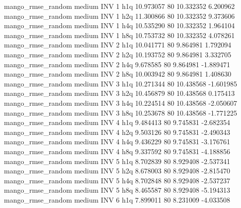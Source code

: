 mango_rmse_random     medium      INV                 1                  h1q 10.973057 80      10.332352           6.200962
mango_rmse_random     medium      INV                 1                  h2q 11.300866 80      10.332352           9.373606
mango_rmse_random     medium      INV                 1                  h4q 10.535290 80      10.332352           1.964104
mango_rmse_random     medium      INV                 1                  h8q 10.753732 80      10.332352           4.078261
mango_rmse_random     medium      INV                 2                  h1q 10.041771 80       9.864981           1.792094
mango_rmse_random     medium      INV                 2                  h2q 10.193752 80       9.864981           3.332705
mango_rmse_random     medium      INV                 2                  h4q  9.678585 80       9.864981          -1.889471
mango_rmse_random     medium      INV                 2                  h8q 10.003942 80       9.864981           1.408630
mango_rmse_random     medium      INV                 3                  h1q 10.271344 80      10.438568          -1.601985
mango_rmse_random     medium      INV                 3                  h2q 10.456879 80      10.438568           0.175413
mango_rmse_random     medium      INV                 3                  h4q 10.224514 80      10.438568          -2.050607
mango_rmse_random     medium      INV                 3                  h8q 10.253678 80      10.438568          -1.771225
mango_rmse_random     medium      INV                 4                  h1q  9.484413 80       9.745831          -2.682354
mango_rmse_random     medium      INV                 4                  h2q  9.503126 80       9.745831          -2.490343
mango_rmse_random     medium      INV                 4                  h4q  9.436229 80       9.745831          -3.176761
mango_rmse_random     medium      INV                 4                  h8q  9.337592 80       9.745831          -4.188856
mango_rmse_random     medium      INV                 5                  h1q  8.702839 80       8.929408          -2.537341
mango_rmse_random     medium      INV                 5                  h2q  8.678003 80       8.929408          -2.815470
mango_rmse_random     medium      INV                 5                  h4q  8.702848 80       8.929408          -2.537237
mango_rmse_random     medium      INV                 5                  h8q  8.465587 80       8.929408          -5.194313
mango_rmse_random     medium      INV                 6                  h1q  7.899011 80       8.231009          -4.033508
